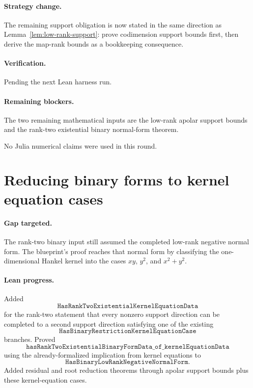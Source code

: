 \documentclass[11pt]{article}
\begin{document}
\paragraph{Strategy change.}
The remaining support obligation is now stated in the same direction as
Lemma~\ref{lem:low-rank-support}: prove codimension support bounds first, then
derive the map-rank bounds as a bookkeeping consequence.

\paragraph{Verification.}
Pending the next Lean harness run.

\paragraph{Remaining blockers.}
The two remaining mathematical inputs are the low-rank apolar support bounds
and the rank-two existential binary normal-form theorem.

No Julia numerical claims were used in this round.

\section*{Reducing binary forms to kernel equation cases}

\paragraph{Gap targeted.}
The rank-two binary input still assumed the completed low-rank negative normal
form.  The blueprint's proof reaches that normal form by classifying the
one-dimensional Hankel kernel into the cases \(xy\), \(y^2\), and
\(x^2+y^2\).

\paragraph{Lean progress.}
Added
\[
\texttt{HasRankTwoExistentialKernelEquationData}
\]
for the rank-two statement that every nonzero support direction can be
completed to a second support direction satisfying one of the existing
\[
\texttt{HasBinaryRestrictionKernelEquationCase}
\]
branches.  Proved
\[
\texttt{hasRankTwoExistentialBinaryFormData\_of\_kernelEquationData}
\]
using the already-formalized implication from kernel equations to
\[
\texttt{HasBinaryLowRankNegativeNormalForm}.
\]
Added residual and root reduction theorems through apolar support bounds plus
these kernel-equation cases.
\end{document}
